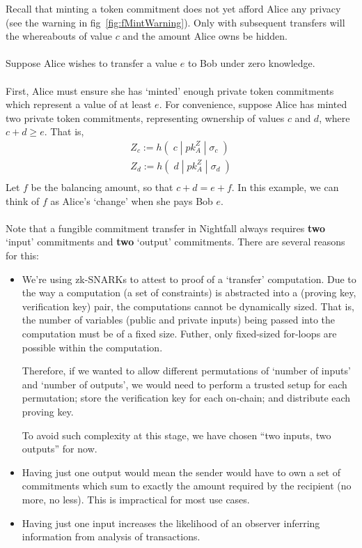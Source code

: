 \documentclass{article}
\begin{document}
\noindent
Recall that minting a token commitment does not yet afford Alice any privacy (see the warning in fig~\ref{fig:fMintWarning}). Only with subsequent transfers will the whereabouts of value $c$ and the amount Alice owns be hidden.\\
\\



Suppose Alice wishes to transfer a value $e$ to Bob under zero knowledge.\\
\\
First, Alice must ensure she has `minted' enough private token commitments which represent a value of at least $e$.
For convenience, suppose Alice has minted two private token commitments, representing ownership of values $c$ and $d$, where $c+d \geq e$. That is,
\begin{align*}
  Z_c := h(\;c\;|\;pk^Z_A\;|\;\sigma_c\;)\\
  Z_d := h(\;d\;|\;pk^Z_A\;|\;\sigma_d\;)\\
\end{align*}
Let $f$ be the balancing amount, so that $c+d = e+f$. In this example, we can think of $f$ as Alice's `change' when she pays Bob $e$.\\
\\
Note that a fungible commitment transfer in Nightfall always requires \textbf{two} `input' commitments and \textbf{two} `output' commitments. There are several reasons for this:
\begin{itemize}
  \item We're using zk-SNARKs to attest to proof of a `transfer' computation. Due to the way a computation (a set of constraints) is abstracted into a (proving key, verification key) pair, the computations cannot be dynamically sized. That is, the number of variables (public and private inputs) being passed into the computation must be of a fixed size. Futher, only fixed-sized for-loops are possible within the computation.

  Therefore, if we wanted to allow different permutations of `number of inputs' and `number of outputs', we would need to perform a trusted setup for each permutation; store the verification key for each on-chain; and distribute each proving key.

  To avoid such complexity at this stage, we have chosen ``two inputs, two outputs'' for now.

  \item Having just one output would mean the sender would have to own a set of commitments which sum to exactly the amount required by the recipient (no more, no less). This is impractical for most use cases.
  \item Having just one input increases the likelihood of an observer inferring information from analysis of transactions.
\end{itemize}
\ \\
\end{document}
